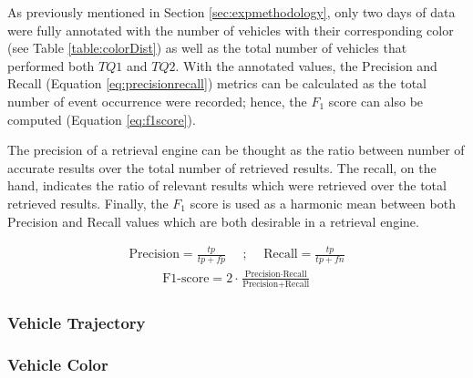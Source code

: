 As previously mentioned in Section \ref{sec:expmethodology}, only two days of data were fully annotated with the number of vehicles with their corresponding color (see Table \ref{table:colorDist}) as well as the total number of vehicles that performed both $TQ1$ and $TQ2$. With the annotated values, the Precision and Recall (Equation \ref{eq:precisionrecall}) metrics can be calculated as the total number of event occurrence were recorded; hence, the $F_1$ score can also be computed (Equation \ref{eq:f1score}). 

The precision of a retrieval engine can be thought as the ratio between number of accurate results over the total number of retrieved results. The recall, on the hand, indicates the ratio of relevant results which were retrieved over the total retrieved results. Finally, the $F_1$ score is used as a harmonic mean between both Precision and Recall values which are both desirable in a retrieval engine.




\begin{align}
\label{eq:precisionrecall}
    \text{Precision} = \frac{tp}{tp + fp}   \hspace{1em} \text{ ; }  \hspace{1em} \text{Recall}  = \frac{tp}{tp + fn}
\end{align}
\begin{align}
\label{eq:f1score}
\text{F1-score}  = 2\cdot\frac{\text{Precision} \cdot \text{Recall}}{\text{Precision} + \text{Recall}}
\end{align}


\subsubsection{Vehicle Trajectory}
\subsubsection{Vehicle Color}

